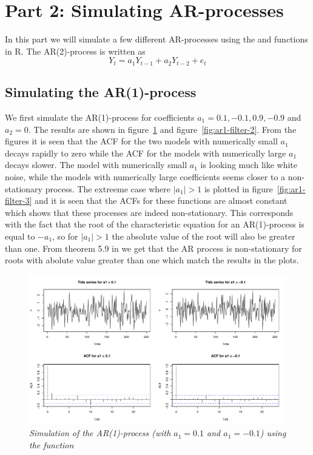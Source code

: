 \section*{Part 2: Simulating AR-processes}
In this part we will simulate a few different AR-processes using the  and  functions in R. The AR(2)-process is written as 
\begin{equation*}
    Y_t = a_1Y_{t-1} + a_2Y_{t-2} + e_t
\end{equation*}

\subsection*{Simulating the AR(1)-process}
We first simulate the AR(1)-process for coefficients $a_1=0.1, -0.1, 0.9, -0.9$ and $a_2=0$. The results are shown in figure~\ref{fig:ar1-filter-1} and figure~\ref{fig:ar1-filter-2}. From the figures it is seen that the ACF for the two models with numerically small $a_1$ decays rapidly to zero while the ACF for the models with numerically large $a_1$ decays slower. The model with numerically small $a_1$ is looking much like white noise, while the models with numerically large coefficients seems closer to a non-stationary process. The extreeme case where $|a_1|>1$ is plotted in figure~\ref{fig:ar1-filter-3} and it is seen that the ACFs for these functions are almost constant which shows that these processes are indeed non-stationary. This corresponds with the fact that the root of the characteristic equation for an AR(1)-process is equal to $-a_1$, so for $|a_1|>1$ the absolute value of the root will also be greater than one. From theorem 5.9 in \cite{hm} we get that the AR process is non-stationary for roots with abolute value greater than one which match the results in the plots.

\begin{figure}
    \centering
    \includegraphics[width=140mm]{ar1-filter-1.pdf}
    \caption{\textit{Simulation of the AR(1)-process (with $a_1=0.1$ and $a_1=-0.1$) using the  function}}
    \label{fig:ar1-filter-1}
\end{figure}

